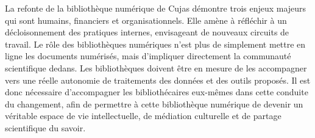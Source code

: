 La refonte de la bibliothèque numérique de Cujas démontre trois enjeux majeurs qui sont humains, financiers et organisationnels. Elle amène à réfléchir à un décloisonnement des pratiques internes, envisageant de nouveaux circuits de travail. Le rôle des bibliothèques numériques n'est plus de simplement mettre en ligne les documents numérisés, mais d'impliquer directement la communauté scientifique dedans. Les bibliothèques doivent être en mesure de les accompagner vers une réelle autonomie de traitements des données et des outils proposés. Il est donc nécessaire d'accompagner les bibliothécaires eux-mêmes dans cette conduite du changement, afin de permettre à cette bibliothèque numérique de devenir un véritable espace de vie intellectuelle, de médiation culturelle et de partage scientifique du savoir.